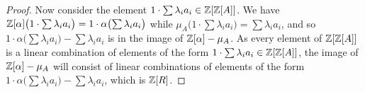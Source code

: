 \documentclass[../../solutions]{subfiles}
\begin{document}
\begin{proof}
  Now consider the element $1\cdot \sum\lambda_i a_i\in{\mathbb{Z}}[{\mathbb{Z}}[A]]$.
  We have
  ${\mathbb{Z}}[\alpha]\bigl(1\cdot \sum\lambda_i
  a_i\bigr)=1\cdot\alpha\bigl(\sum \lambda_i a_i\bigr)$ while
  $\mu_A\bigl(1\cdot \sum \lambda_i a_i\bigr)=\sum \lambda_i a_i$, and
  so $1\cdot \alpha\bigl(\sum\lambda_i a_i\bigr) - \sum \lambda_i a_i$
  is in the image of ${\mathbb{Z}}[\alpha]-\mu_A$.  As every element of
  ${\mathbb{Z}}[{\mathbb{Z}}[A]]$ is a linear combination of elements of the form
  $1\cdot \sum\lambda_i a_i\in{\mathbb{Z}}[{\mathbb{Z}}[A]]$, the image of
  ${\mathbb{Z}}[\alpha]-\mu_A$ will consist of linear combinations of elements
  of the form
  $1\cdot \alpha\bigl(\sum\lambda_i a_i\bigr) - \sum \lambda_i a_i$,
  which is ${\mathbb{Z}}[R]$.
\end{proof}
\end{document}
